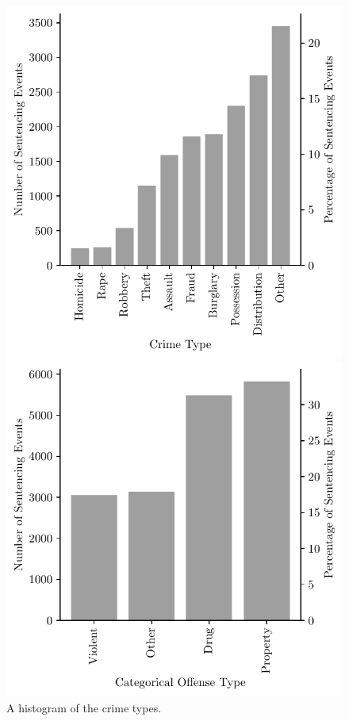 \documentclass[11pt, oneside]{article}   	%
\theoremstyle{ModifiedStyle}
\begin{document}
%
\begin{figure}[h!]
	\centering
	\begin{minipage}{.45\textwidth}
		\centering
		\hspace{-4mm}
		\includegraphics[scale=0.75]{Figures/Crime_Type_Histogram}
		\hspace{4mm}
		\vspace{-6.6mm}
		\caption{A histogram of the crime types.}
		\label{Figure_Hester_Data_Crime_Type_Histogram}
	\end{minipage}
	\hspace{5mm}
	\begin{minipage}{0.45\textwidth}
		\centering
		\hspace{-3mm}
		\includegraphics[scale=0.75]{Figures/Categorical_Offense_Type_Histogram}

\end{minipage}
\end{figure}
\end{document}
